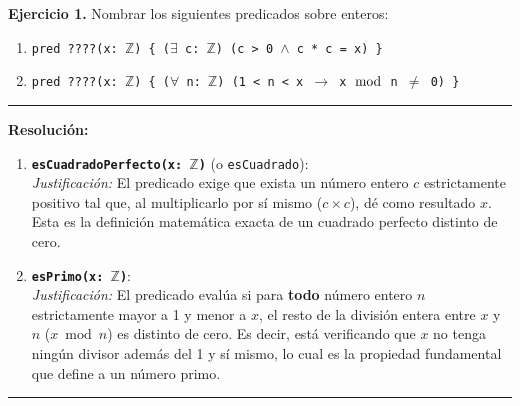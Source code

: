 \hypertarget{ej1}{}
\noindent \textbf{Ejercicio 1.} Nombrar los siguientes predicados sobre enteros:

\begin{enumerate}[label=\alph*)]
    \item \texttt{pred ????(x: $\mathbb{Z}$) \{ ($\exists$ c: $\mathbb{Z}$) (c > 0 $\wedge$ c * c = x) \}}
    \item \texttt{pred ????(x: $\mathbb{Z}$) \{ ($\forall$ n: $\mathbb{Z}$) (1 < n < x $\rightarrow$ x $\bmod$ n $\neq$ 0) \}}
\end{enumerate}

\vspace{0.2cm}
{\color{gray}\hrule}
\vspace{0.4cm}

\textbf{Resolución:}

\begin{enumerate}[label=\textbf{\alph*)}]

    \item \textbf{\texttt{esCuadradoPerfecto(x: $\mathbb{Z}$)}} (o \texttt{esCuadrado}): \\
    \textit{Justificación:} El predicado exige que exista un número entero $c$ estrictamente positivo tal que, al multiplicarlo por sí mismo ($c \times c$), dé como resultado $x$. Esta es la definición matemática exacta de un cuadrado perfecto distinto de cero.

    \vspace{0.4cm}
    \item \textbf{\texttt{esPrimo(x: $\mathbb{Z}$)}}: \\
    \textit{Justificación:} El predicado evalúa si para \textbf{todo} número entero $n$ estrictamente mayor a 1 y menor a $x$, el resto de la división entera entre $x$ y $n$ ($x \bmod n$) es distinto de cero. Es decir, está verificando que $x$ no tenga ningún divisor además del 1 y sí mismo, lo cual es la propiedad fundamental que define a un número primo.

\end{enumerate}

\vspace{0.5cm}
\hrule
\vspace{0.5cm}